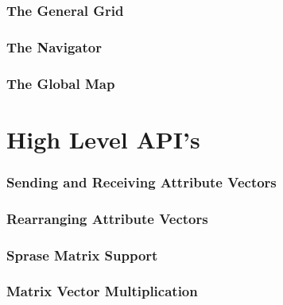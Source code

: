 \documentclass{article}
\begin{document}
\section{The General Grid}

\vspace*{\fill}
\newpage
%

\vspace*{\fill}
\newpage
%
%
\section{The Navigator}

\vspace*{\fill}
\newpage
%
%
\section{The Global Map}

\vspace*{\fill}
\newpage
%
%
\part{High Level API's}
%
\section{Sending and Receiving Attribute Vectors}

\vspace*{\fill}
\newpage
%
\section{Rearranging Attribute Vectors}

\vspace*{\fill}
\newpage
%
\section{Sprase Matrix Support}

\vspace*{\fill}
\newpage
%

\vspace*{\fill}
\newpage
%

\vspace*{\fill}
\newpage
%

\vspace*{\fill}
\newpage
%

\vspace*{\fill}
\newpage
%
%
\section{Matrix Vector Multiplication}

\vspace*{\fill}
\newpage
%
\end{document}
